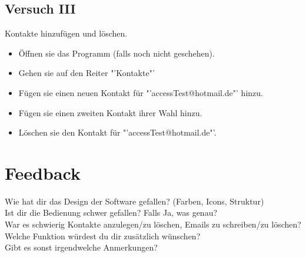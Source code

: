 \documentclass[10pt,a4paper]{article}
\begin{document}
\subsection*{Versuch III}
Kontakte hinzufügen und löschen.
\begin{itemize}
	\item Öffnen sie das Programm (falls noch nicht geschehen).
	\item Gehen sie auf den Reiter "'Kontakte"'
	\item Fügen sie einen neuen Kontakt für "'accessTest@hotmail.de"' hinzu.
	\item Fügen sie einen zweiten Kontakt ihrer Wahl hinzu.
	\item Löschen sie den Kontakt für "'accessTest@hotmail.de"'. 	
\end{itemize}
\section*{Feedback}
Wie hat dir das Design der Software gefallen? (Farben, Icons, Struktur)\\
Ist dir die Bedienung schwer gefallen? Falls Ja, was genau?\\
War es schwierig Kontakte anzulegen/zu löschen, Emails zu schreiben/zu löschen?\\
Welche Funktion würdest du dir zusätzlich wünschen?\\
Gibt es sonst irgendwelche Anmerkungen?\\
\end{document}
